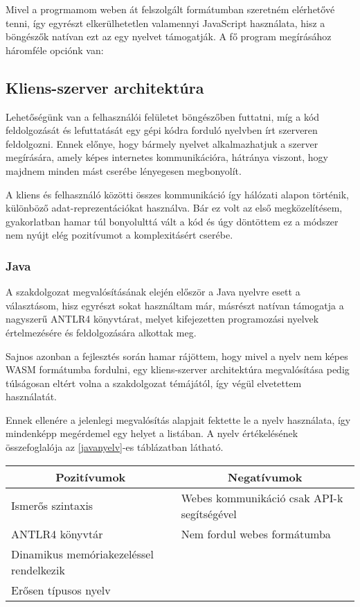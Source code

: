 Mivel a progrmamom weben át felszolgált formátumban szeretném elérhetővé tenni, így egyrészt elkerülhetetlen valamennyi JavaScript használata, hisz a böngészők natívan ezt az egy nyelvet támogatják. A fő program megírásához háromféle opciónk van:

\subsection{Kliens-szerver architektúra}

Lehetőségünk van a felhasználói felületet böngészőben futtatni, míg a kód feldolgozását és lefuttatását egy gépi kódra forduló nyelvben írt szerveren feldolgozni. Ennek előnye, hogy bármely nyelvet alkalmazhatjuk a szerver megírására, amely képes internetes kommunikációra, hátránya viszont, hogy majdnem minden mást cserébe lényegesen megbonyolít.

A kliens és felhasználó közötti összes kommunikáció így hálózati alapon történik, különböző adat-reprezentációkat használva. Bár ez volt az első megközelítésem, gyakorlatban hamar túl bonyolulttá vált a kód és úgy döntöttem ez a módszer nem nyújt elég pozitívumot a komplexitásért cserébe. 

\subsubsection{Java}

A szakdolgozat megvalósításának elején először a Java nyelvre esett a választásom, hisz egyrészt sokat használtam már, másrészt natívan támogatja a nagyszerű ANTLR4 könyvtárat, melyet kifejezetten programozási nyelvek értelmezésére és feldolgozására alkottak meg.\cite{antlr-book}

Sajnos azonban a fejlesztés során hamar rájöttem, hogy mivel a nyelv nem képes WASM formátumba fordulni, egy kliens-szerver architektúra megvalósítása pedig túlságosan eltért volna a szakdolgozat témájától, így végül elvetettem használatát.

Ennek ellenére a jelenlegi megvalósítás alapjait fektette le a nyelv használata, így mindenképp megérdemel egy helyet a listában. A nyelv értékelésének összefoglalója az \ref{javanyelv}-es táblázatban látható.

\begin{center}
  \begin{tabularx}{\textwidth}{X X}
    \hline
    \multicolumn{1}{c}{\bfseries{Pozitívumok}}         & \multicolumn{1}{c}{\bfseries{Negatívumok}} \\
    \hline
    Ismerős szintaxis & Webes kommunikáció csak API-k segítségével \\
    ANTLR4 könyvtár & Nem fordul webes formátumba \\
    Dinamikus memóriakezeléssel rendelkezik \\
    Erősen típusos nyelv \\
    \hline
  \end{tabularx}
\end{center}

